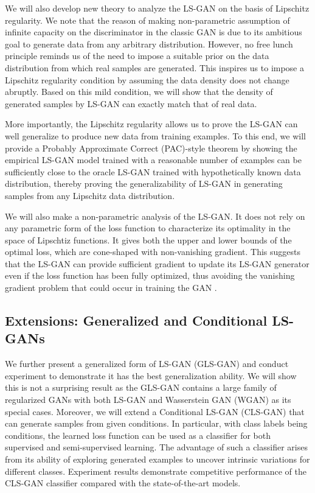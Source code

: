 We will also develop new theory to analyze the LS-GAN on the basis of Lipschitz regularity.  We note that the reason of making non-parametric assumption of infinite capacity on the discriminator in the classic GAN is due to its ambitious goal to generate data from any arbitrary distribution.  However,
no free lunch \cite{wolpert1996lack} principle reminds us of the need to impose a suitable prior on the data distribution from which real samples are generated.  This inspires us to impose a
Lipschitz regularity condition by assuming the data density does not change abruptly.
Based on this mild condition, we will show that the density of generated samples by LS-GAN can exactly match that of real data.

More importantly, the Lipschitz regularity allows us to prove the LS-GAN can well generalize to produce new data from training examples.
To this end, we will provide a Probably Approximate Correct (PAC)-style theorem by showing the empirical LS-GAN model trained with a reasonable number of examples can be sufficiently close to the oracle LS-GAN trained with hypothetically known data distribution, thereby proving the generalizability of LS-GAN in generating samples from any Lipschitz data distribution.

We will also make a non-parametric analysis of the LS-GAN. It does not rely on any parametric form of the loss function to characterize its optimality in the space of Lipschtiz functions. It gives both the upper and lower bounds of the optimal loss, which are cone-shaped with non-vanishing gradient. This suggests that the LS-GAN can provide sufficient gradient to update its LS-GAN generator even if the loss function has been fully optimized, thus avoiding the vanishing gradient problem that could occur in training the GAN \cite{arjovsky2017towards}.

\subsection{Extensions: Generalized and Conditional LS-GANs}

We further present a generalized form of LS-GAN (GLS-GAN) and conduct experiment to demonstrate it has the best generalization ability. We will show this is not a surprising result as the GLS-GAN contains a large family of regularized GANs with both LS-GAN and Wasserstein GAN (WGAN) \cite{wgan17} as its special cases.
Moreover, we will extend a Conditional LS-GAN (CLS-GAN) that can generate samples from given conditions.  In particular, with class labels being conditions, the learned loss function can be used as a classifier for both supervised and semi-supervised learning.  The advantage of such a classifier arises from its ability of exploring generated examples to uncover intrinsic variations for different classes. Experiment results demonstrate competitive performance of the CLS-GAN classifier compared with the state-of-the-art models.


